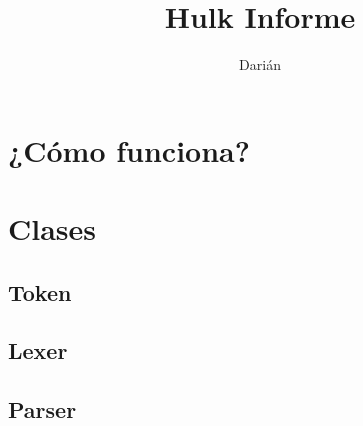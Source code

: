 \documentclass[12pt,a4paper]{article}
\author{Darián}
\title{Hulk Informe}
\begin{document}
\section{¿Cómo funciona?}
\section{Clases}
\subsection{Token}
\subsection{Lexer}
\subsection{Parser}
\end{document}
